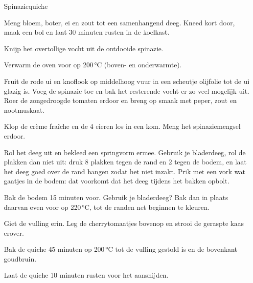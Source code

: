 \begin{recipe}{Spinaziequiche}
\begin{steps}
  \item Meng bloem, boter, ei en zout tot een samenhangend deeg. Kneed kort door,
        maak een bol en laat 30 minuten rusten in de koelkast.
  \item Knijp het overtollige vocht uit de ontdooide spinazie.
  \item Verwarm de oven voor op 200\,°C (boven- en onderwarmte).
  \item Fruit de rode ui en knoflook op middelhoog vuur in een scheutje olijfolie tot de ui glazig is. Voeg de spinazie toe en
        bak het resterende vocht er zo veel mogelijk uit. Roer de zongedroogde tomaten
        erdoor en breng op smaak met peper, zout en nootmuskaat.
  \item Klop de crème fraîche en de 4 eieren los in een kom. Meng het
        spinaziemengsel erdoor.
  \item Rol het deeg uit en bekleed een springvorm ermee. Gebruik je
        bladerdeeg, rol de plakken dan niet uit: druk 8 plakken tegen de rand
        en 2 tegen de bodem, en laat het deeg goed over de rand hangen zodat
        het niet inzakt. Prik met een vork wat gaatjes in de bodem: dat
        voorkomt dat het deeg tijdens het bakken opbolt.
  \item Bak de bodem 15 minuten voor. Gebruik je bladerdeeg? Bak dan in
        plaats daarvan even voor op 220\,°C, tot de randen net beginnen te
        kleuren.
  \item Giet de vulling erin. Leg de cherrytomaatjes bovenop en strooi de
        geraspte kaas erover.
  \item Bak de quiche 45 minuten op 200\,°C tot de vulling gestold is en de bovenkant
        goudbruin.
  \item Laat de quiche 10 minuten rusten voor het aansnijden.
\end{steps}

\end{recipe}
